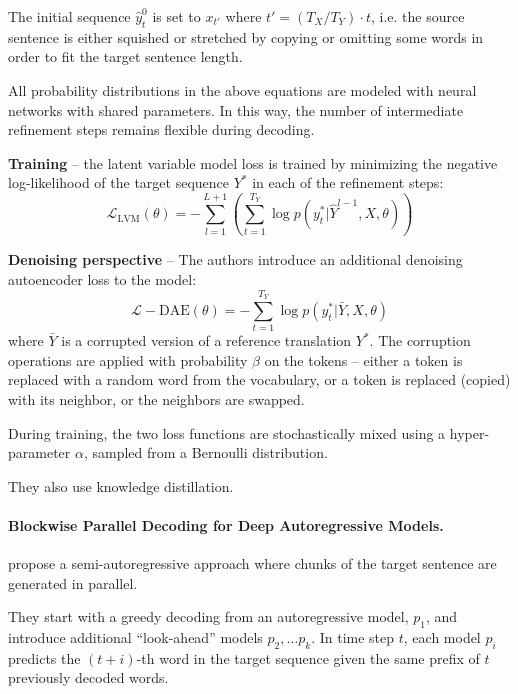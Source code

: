 The initial sequence $\hat{y}_t^0$ is set to $x_{t'}$ where
$t' = (T_X / T_Y) \cdot t$, i.e. the source sentence is either squished or
stretched by copying or omitting some words in order to fit the target sentence
length.

All probability distributions in the above equations are modeled with neural
networks with shared parameters. In this way, the number of intermediate
refinement steps remains flexible during decoding.

\textbf{Training} -- the latent variable model loss is trained by minimizing the
negative log-likelihood of the target sequence $Y^*$ in each of the refinement
steps:
\begin{equation}
  \mathcal{L}_{\text{LVM}}(\theta) = - \sum_{l=1}^{L+1} \left(
    \sum_{t=1}^{T_Y} \log p(y_t^* | \hat{Y}^{l-1}, X, \theta)
  \right) \label{eq:refinement-lvm-loss}
\end{equation}


\textbf{Denoising perspective} -- The authors introduce an additional denoising
autoencoder loss to the model:
\begin{equation}
  \mathcal{L}-{\text{DAE}}(\theta) = - \sum_{t=1}^{T_Y} \log p(y_t^* | \bar{Y}, X, \theta)
\end{equation}
where $\bar{Y}$ is a corrupted version of a reference translation $Y^*$. The
corruption operations are applied with probability $\beta$ on the tokens --
either a token is replaced with a random word from the vocabulary, or a token is
replaced (copied) with its neighbor, or the neighbors are swapped.

During training, the two loss functions are stochastically mixed using a
hyper-parameter $\alpha$, sampled from a Bernoulli distribution.

They also use knowledge distillation.


\paragraph{Blockwise Parallel Decoding for Deep Autoregressive Models.}
\citet{stern2018blockwise} propose a semi-autoregressive approach where chunks
of the target sentence are generated in parallel.

They start with a greedy decoding from an autoregressive model, $p_1$, and
introduce additional ``look-ahead'' models $p_2, \ldots p_k$. In time step $t$,
each model $p_i$ predicts the $(t + i)$-th word in the target sequence given the
same prefix of $t$ previously decoded words.

